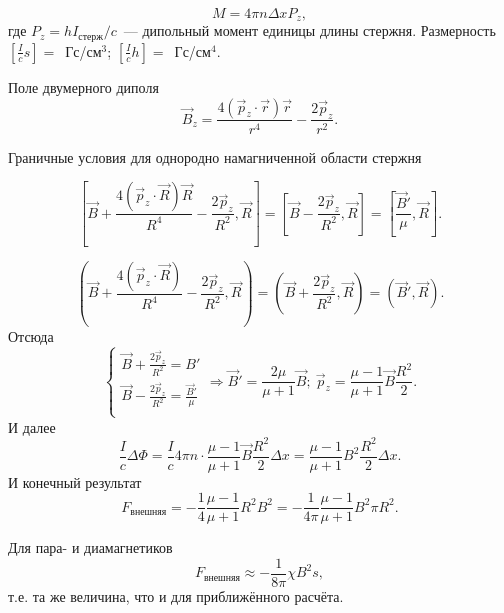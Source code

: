 \begin{equation*}
	M = 4\pi n \Delta x P_z,
\end{equation*}
где $P_z = h I_{\text{стерж}}/c$~--- дипольный момент единицы длины стержня.
Размерность $\left[ \frac{I}{c}s \right] =$~Гс/см$^3$; $\left[ \frac{I}{c}h \right] =$~Гс/см$^4$.

Поле двумерного диполя
\begin{equation*}
	\vec B_z = \frac{4(\vec p_z \cdot \vec r) \vec r}{r^4} - \frac{2\vec p_z}{r^2}.
\end{equation*}

Граничные условия для однородно намагниченной области стержня

\begin{equation*}
	\left[ \vec B + \frac{4(\vec p_z \cdot \vec R) \vec R}{R^4} - \frac{2\vec p_z}{R^2}, \vec R \right] = \left[ \vec B - \frac{2\vec p_z}{R^2}, \vec R \right] = \left[ \frac{\vec B'}{\mu}, \vec R \right].
\end{equation*}

\begin{equation*}
	\left( \vec B + \frac{4(\vec p_z \cdot \vec R)}{R^4} - \frac{2\vec p_z}{R^2}, \vec R \right) = \left( \vec B + \frac{2\vec p_z}{R^2}, \vec R \right) = \left( \vec B', \vec R \right).
\end{equation*}
Отсюда
\begin{equation*}
	\begin{cases}
		\vec B + \frac{2\vec p_z}{R^2} = B'\\
		\vec B - \frac{2\vec p_z}{R^2} = \frac{\vec B'}{\mu}\\
	\end{cases}
	\Rightarrow \vec B' = \frac{2\mu}{\mu + 1} \vec B;~\vec p_z = \frac{\mu - 1}{\mu + 1} \vec B \frac{R^2}{2}.
\end{equation*}
И далее 
\begin{equation*}
	\frac{I}{c}\Delta \Phi = \frac{I}{c} 4\pi n \cdot \frac{\mu - 1}{\mu + 1} \vec B \frac{R^2}{2} \Delta x = \frac{\mu - 1}{\mu + 1} B^2 \frac{R^2}{2} \Delta x.
\end{equation*}
И конечный результат
\begin{equation*}
	F_{\text{внешняя}} = - \frac{1}{4} \frac{\mu - 1}{\mu + 1} R^2 B^2 = - \frac{1}{4\pi} \frac{\mu - 1}{\mu + 1} B^2 \pi R^2.
\end{equation*}

Для пара- и диамагнетиков
\begin{equation*}
F_{\text{внешняя}} \approx - \frac{1}{8\pi} \chi B^2 s,
\end{equation*}
т.е. та же величина, что и для приближённого расчёта.



